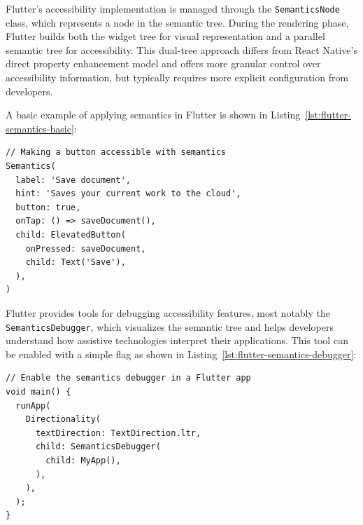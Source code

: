 Flutter's accessibility implementation is managed through the \texttt{SemanticsNode} class, which represents a node in the semantic tree. During the rendering phase, Flutter builds both the widget tree for visual representation and a parallel semantic tree for accessibility. This dual-tree approach differs from React Native's direct property enhancement model and offers more granular control over accessibility information, but typically requires more explicit configuration from developers.

A basic example of applying semantics in Flutter is shown in Listing~\ref{lst:flutter-semantics-basic}:

\begin{lstlisting}[style=DartStyle, caption=Basic Semantics implementation in Flutter, label=lst:flutter-semantics-basic]
// Making a button accessible with semantics
Semantics(
  label: 'Save document',
  hint: 'Saves your current work to the cloud',
  button: true,
  onTap: () => saveDocument(),
  child: ElevatedButton(
    onPressed: saveDocument,
    child: Text('Save'),
  ),
)
\end{lstlisting}

Flutter provides tools for debugging accessibility features, most notably the \\\texttt{SemanticsDebugger}, which visualizes the semantic tree and helps developers understand how assistive technologies interpret their applications. This tool can be enabled with a simple flag as shown in Listing~\ref{lst:flutter-semantics-debugger}:

\begin{lstlisting}[style=DartStyle, caption=Using the SemanticsDebugger in Flutter, label=lst:flutter-semantics-debugger]
// Enable the semantics debugger in a Flutter app
void main() {
  runApp(
    Directionality(
      textDirection: TextDirection.ltr,
      child: SemanticsDebugger(
        child: MyApp(),
      ),
    ),
  );
}
\end{lstlisting}

